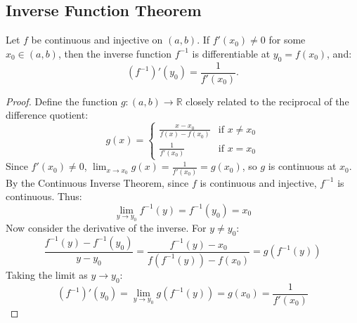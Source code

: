 \documentclass[
	UTF-8,
	11pt, %
	a4paper, %
]{LegrandOrangeBook}
\begin{document}
    \newpage

    \subsection{Inverse Function Theorem}

    \begin{theorem}
    Let $f$ be continuous and injective on $(a, b)$. If $f'(x_0) \neq 0$ for some $x_0 \in (a, b)$, then the inverse function $f^{-1}$ is differentiable at $y_0 = f(x_0)$, and:
    \[ (f^{-1})'(y_0) = \frac{1}{f'(x_0)}. \]
    \end{theorem}

    \begin{proof}
    Define the function $g: (a, b) \to \mathbb{R}$ closely related to the reciprocal of the difference quotient:
    \[
    g(x) = \begin{cases} 
    \frac{x - x_0}{f(x) - f(x_0)} & \text{if } x \neq x_0 \\
    \frac{1}{f'(x_0)} & \text{if } x = x_0
    \end{cases}
    \]
    Since $f'(x_0) \neq 0$, $\lim_{x \to x_0} g(x) = \frac{1}{f'(x_0)} = g(x_0)$, so $g$ is continuous at $x_0$.
    By the Continuous Inverse Theorem, since $f$ is continuous and injective, $f^{-1}$ is continuous. Thus:
    \[ \lim_{y \to y_0} f^{-1}(y) = f^{-1}(y_0) = x_0 \]
    Now consider the derivative of the inverse. For $y \neq y_0$:
    \[ \frac{f^{-1}(y) - f^{-1}(y_0)}{y - y_0} = \frac{f^{-1}(y) - x_0}{f(f^{-1}(y)) - f(x_0)} = g(f^{-1}(y)) \]
    Taking the limit as $y \to y_0$:
    \[ (f^{-1})'(y_0) = \lim_{y \to y_0} g(f^{-1}(y)) = g(x_0) = \frac{1}{f'(x_0)} \]
    \end{proof}
\end{document}
